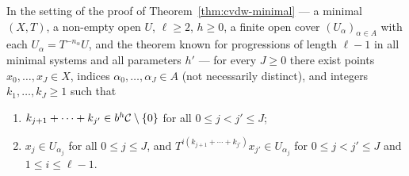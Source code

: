 \begin{lemma}
  \label{lem:color-focusing}
  \leanok
  In the setting of the proof of Theorem~\ref{thm:cvdw-minimal} --- a minimal $(X,T)$, a
  non-empty open $U$, $\ell \geq 2$, $h \geq 0$, a finite open cover $(U_\alpha)_{\alpha \in A}$
  with each $U_\alpha = T^{-n_\alpha}U$, and the theorem known for progressions of length
  $\ell - 1$ in all minimal systems and all parameters $h'$ --- for every $J \geq 0$ there exist
  points $x_0,\dots,x_J \in X$, indices $\alpha_0,\dots,\alpha_J \in A$ (not necessarily
  distinct), and integers $k_1,\dots,k_J \geq 1$ such that
  \begin{enumerate}
    \item[(1)] $k_{j+1} + \cdots + k_{j'} \in b^h\mathcal{C} \setminus \{0\}$ for all $0 \leq j < j' \leq J$;
    \item[(2)] $x_j \in U_{\alpha_j}$ for all $0 \leq j \leq J$, and
      $T^{i(k_{j+1}+\cdots+k_{j'})} x_{j'} \in U_{\alpha_j}$ for $0 \leq j < j' \leq J$ and
      $1 \leq i \leq \ell-1$.
  \end{enumerate}
\end{lemma}

